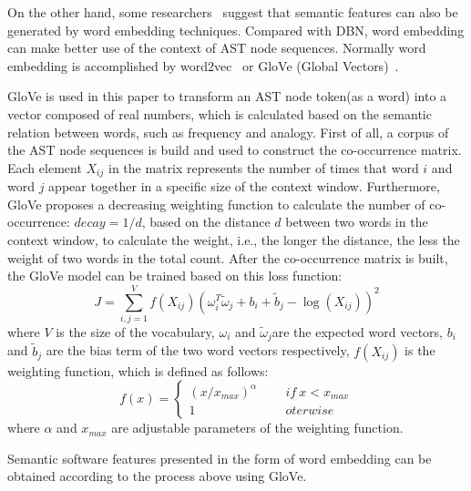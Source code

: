 \documentclass[journal]{IEEEtran}
\begin{document}
On the other hand, some researchers~\cite{fan2019deep,li2017software} suggest that semantic features can also be generated by word embedding techniques. Compared with DBN, word embedding can make better use of the context of AST node sequences. Normally word embedding is accomplished by word2vec~\cite{mikolov2013distributed} or GloVe (Global Vectors)~\cite{pennington2014glove}.


GloVe is used in this paper to transform an AST node token(as a word) into a vector composed of real numbers, which is calculated based on the semantic relation between words, such as frequency and analogy. First of all, a corpus of the AST node sequences is build and used to construct the co-occurrence matrix. Each element $X_{ij}$ in the matrix represents the number of times that word $i$ and word $j$ appear together in a specific size of the context window. Furthermore, GloVe proposes a decreasing weighting function to calculate the number of co-occurrence: $decay=1/d$, based on the distance $d$ between two words in the context window, to calculate the weight, i.e., the longer the distance, the less the weight of two words in the total count. After the co-occurrence matrix is built, the GloVe model can be trained based on this loss function:
\begin{equation}
J=\sum_{i,j=1}^{V}f(X_{ij})(\omega_{i}^{T} \tilde{\omega}_{j}+b_{i}+\tilde{b}_{j}-\log(X_{ij}))^{2}
\end{equation}
where $V$ is the size of the vocabulary, $\omega_{i}$ and $\tilde{\omega}_{j}$are the expected word vectors, $b_{i}$ and $\tilde{b}_{j}$ are the bias term of the two word vectors respectively, $f(X_{ij})$ is the weighting function, which is defined as follows:
\begin{equation}
f(x)=
\begin{cases}
(x/x_{max})^{\alpha}\quad \ \ & if\ x<x_{max}\\
1\quad \ \ & oterwise
\end{cases}
\end{equation}
where $\alpha$ and $x_{max}$ are adjustable parameters of the weighting function.

Semantic software features presented in the form of word embedding can be obtained according to the process above using GloVe.
\end{document}
